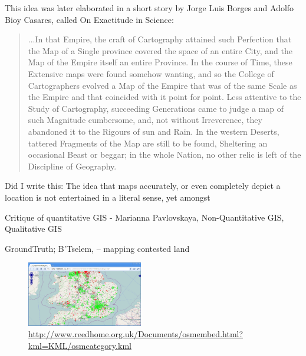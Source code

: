 \documentclass[11pt]{report}
\begin{document}
This idea was later elaborated in a short story by Jorge Luis Borges and Adolfo Bioy Casares, called On Exactitude in Science:

\begin{quote}
...In that Empire, the craft of Cartography attained such Perfection that the Map of a Single province covered the space of an entire City, and the Map of the Empire itself an entire Province. In the course of Time, these Extensive maps were found somehow wanting, and so the College of Cartographers evolved a Map of the Empire that was of the same Scale as the Empire and that coincided with it point for point. Less attentive to the Study of Cartography, succeeding Generations came to judge a map of such Magnitude cumbersome, and, not without Irreverence, they abandoned it to the Rigours of sun and Rain. In the western Deserts, tattered Fragments of the Map are still to be found, Sheltering an occasional Beast or beggar; in the whole Nation, no other relic is left of the Discipline of Geography.
\cite{borges1946exactitude}
\end{quote}

Did I write this: The idea that maps accurately, or even completely depict a location is not entertained in a literal sense, yet amongst

Critique of quantitative GIS - Marianna Pavlovskaya, Non-Quantitative GIS, Qualitative GIS

GroundTruth; B'Tselem, -- mapping contested land


\begin{figure}
	\begin{flushright}
		\includegraphics[width=0.45\textwidth]{images/osm-missing-parts.png}
	\caption{\url{http://www.reedhome.org.uk/Documents/osmembed.html?kml=KML/osmcategory.kml}}
	\end{flushright}
\end{figure}
\end{document}
